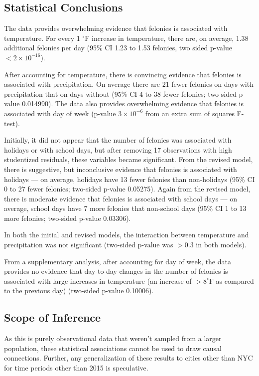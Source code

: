 \documentclass[11pt,notitlepage]{article}
\newcommand{\degf}{^\circ\text{F}}
\begin{document}
\subsection{Statistical Conclusions}

The data provides overwhelming evidence that felonies is associated with temperature. For every 1 $\degf$ increase in temperature, there are, on average, 1.38 additional felonies per day (95\% CI 1.23 to 1.53 felonies, two sided p-value $<2\times10^{-16}$).

After accounting for temperature, there is convincing evidence that felonies is associated with precipitation. On average there are 21 fewer felonies on days with precipitation that on days without (95\% CI 4 to 38 fewer felonies; two-sided p-value 0.014990). The data also provides overwhelming evidence that felonies is associated with day of week (p-value $3 \times 10^{-6}$ from an extra sum of squares F-test).

Initially, it did not appear that the number of felonies was associated with holidays or with school days, but after removing 17 observations with high studentized residuals, these variables became significant. From the revised model, there is suggestive, but inconclusive evidence that felonies is associated with holidays --- on average, holidays have 13 fewer felonies than non-holidays (95\% CI 0 to 27 fewer felonies; two-sided p-value 0.05275). Again from the revised model, there is moderate evidence that felonies is associated with school days --- on average, school days have 7 more felonies that non-school days (95\% CI 1 to 13 more felonies; two-sided p-value 0.03306).

In both the initial and revised models, the interaction between temperature and precipitation was not significant (two-sided p-value was $>0.3$ in both models).


From a supplementary analysis, after accounting for day of week, the data provides no evidence that day-to-day changes in the number of felonies is associated with large increases in temperature (an increase of $>8 \degf$ as compared to the previous day) (two-sided p-value 0.10006).


\subsection{Scope of Inference}

As this is purely observational data that weren't sampled from a larger population, these statistical associations cannot be used to draw causal connections. Further, any generalization of these results to cities other than NYC for time periods other than 2015 is speculative.



\listoftodos

\pagebreak

%
%
\end{document}
